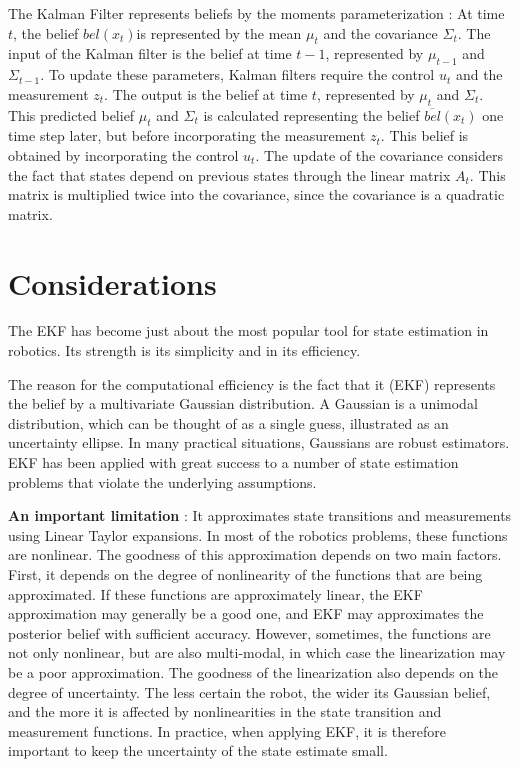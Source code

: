\documentclass[a4paper,12pt]{extarticle}
\theoremstyle{mytheor}
\begin{document}
The Kalman Filter represents beliefs by the moments parameterization : At time $t$, the belief $bel(x_t)$is represented by the mean $\mu_t$ and the covariance $\Sigma_t$. The input of the Kalman filter is the belief at time $t-1$, represented by $\mu_{t-1}$ and $\Sigma_{t-1}$. To update these parameters, Kalman filters require the control $u_t$ and the measurement $z_t$. The output is the belief at time $t$, represented by $\mu_t$ and $\Sigma_t$. This predicted belief $\mu_t$ and $\Sigma_t$ is calculated representing the belief $\overline{bel}(x_t)$ one time step later, but before incorporating the measurement $z_t$. This belief is obtained by incorporating the control $u_t$. The update of the covariance considers the fact that states depend on previous states through the linear matrix $A_t$. This matrix is multiplied twice into the covariance, since the covariance is a quadratic matrix.

\vfill
\section*{Considerations}

The EKF has become just about the most popular tool for state estimation in robotics. Its strength is its simplicity and in its efficiency. 

The reason for the computational efficiency is the fact that it (EKF) represents the belief by a multivariate Gaussian distribution. A Gaussian is a unimodal distribution, which can be thought of as a single guess, illustrated as an uncertainty ellipse. In many practical situations, Gaussians are robust estimators. EKF has been applied with great success to a number of state estimation problems that violate the underlying assumptions.


\textbf{An important limitation} : It approximates state transitions and measurements using Linear Taylor expansions. In most of the robotics problems, these functions are nonlinear. The goodness of this approximation depends on two main factors. First, it depends on the degree of nonlinearity of the functions that are being approximated. If these functions are approximately linear, the EKF approximation may generally be a good one, and EKF may approximates the posterior belief with sufficient accuracy. However, sometimes, the functions are not only nonlinear, but are also multi-modal, in which case the linearization may be a poor approximation. The goodness of the linearization also depends on the degree of uncertainty. The less certain the robot, the wider its Gaussian belief, and the more it is affected by nonlinearities in the state transition and measurement functions. In practice, when applying EKF, it is therefore important to keep the uncertainty of the state estimate small.
\end{document}
